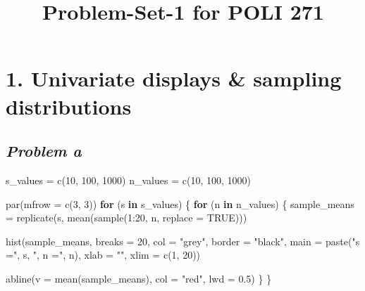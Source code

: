 \documentclass[
  letterpaper,
  DIV=11,
  numbers=noendperiod]{scrartcl}
\title{Problem-Set-1 for POLI 271}
\author{}
\date{}
\newenvironment{Shaded}{\begin{snugshade}}{\end{snugshade}}
\newcommand{\AttributeTok}[1]{\textcolor[rgb]{0.40,0.45,0.13}{#1}}
\newcommand{\ConstantTok}[1]{\textcolor[rgb]{0.56,0.35,0.01}{#1}}
\newcommand{\ControlFlowTok}[1]{\textcolor[rgb]{0.00,0.23,0.31}{\textbf{#1}}}
\newcommand{\DecValTok}[1]{\textcolor[rgb]{0.68,0.00,0.00}{#1}}
\newcommand{\FloatTok}[1]{\textcolor[rgb]{0.68,0.00,0.00}{#1}}
\newcommand{\FunctionTok}[1]{\textcolor[rgb]{0.28,0.35,0.67}{#1}}
\newcommand{\NormalTok}[1]{\textcolor[rgb]{0.00,0.23,0.31}{#1}}
\newcommand{\OtherTok}[1]{\textcolor[rgb]{0.00,0.23,0.31}{#1}}
\newcommand{\SpecialCharTok}[1]{\textcolor[rgb]{0.37,0.37,0.37}{#1}}
\newcommand{\StringTok}[1]{\textcolor[rgb]{0.13,0.47,0.30}{#1}}
\begin{document}
\maketitle


\section{1. Univariate displays \& sampling
distributions}\label{univariate-displays-sampling-distributions}

\subsection{\texorpdfstring{\emph{Problem
a}}{Problem a}}\label{problem-a}

\begin{Shaded}
\begin{Highlighting}[]
\NormalTok{s\_values }\OtherTok{=} \FunctionTok{c}\NormalTok{(}\DecValTok{10}\NormalTok{, }\DecValTok{100}\NormalTok{, }\DecValTok{1000}\NormalTok{)}
\NormalTok{n\_values }\OtherTok{=} \FunctionTok{c}\NormalTok{(}\DecValTok{10}\NormalTok{, }\DecValTok{100}\NormalTok{, }\DecValTok{1000}\NormalTok{)}

\FunctionTok{par}\NormalTok{(}\AttributeTok{mfrow =} \FunctionTok{c}\NormalTok{(}\DecValTok{3}\NormalTok{, }\DecValTok{3}\NormalTok{))}
\ControlFlowTok{for}\NormalTok{ (s }\ControlFlowTok{in}\NormalTok{ s\_values) \{}
  \ControlFlowTok{for}\NormalTok{ (n }\ControlFlowTok{in}\NormalTok{ n\_values) \{}
\NormalTok{    sample\_means }\OtherTok{=} \FunctionTok{replicate}\NormalTok{(s, }\FunctionTok{mean}\NormalTok{(}\FunctionTok{sample}\NormalTok{(}\DecValTok{1}\SpecialCharTok{:}\DecValTok{20}\NormalTok{, n, }\AttributeTok{replace =} \ConstantTok{TRUE}\NormalTok{)))}

    \FunctionTok{hist}\NormalTok{(sample\_means,}
         \AttributeTok{breaks =} \DecValTok{20}\NormalTok{,}
         \AttributeTok{col =} \StringTok{"grey"}\NormalTok{,}
         \AttributeTok{border =} \StringTok{"black"}\NormalTok{,}
         \AttributeTok{main =} \FunctionTok{paste}\NormalTok{(}\StringTok{"s ="}\NormalTok{, s, }\StringTok{", n ="}\NormalTok{, n),}
         \AttributeTok{xlab =} \StringTok{""}\NormalTok{,}
         \AttributeTok{xlim =} \FunctionTok{c}\NormalTok{(}\DecValTok{1}\NormalTok{, }\DecValTok{20}\NormalTok{))}
    
    \FunctionTok{abline}\NormalTok{(}\AttributeTok{v =} \FunctionTok{mean}\NormalTok{(sample\_means), }\AttributeTok{col =} \StringTok{"red"}\NormalTok{, }\AttributeTok{lwd =} \FloatTok{0.5}\NormalTok{)}
\NormalTok{  \}}
\NormalTok{\}}
\end{Highlighting}
\end{Shaded}
\end{document}
